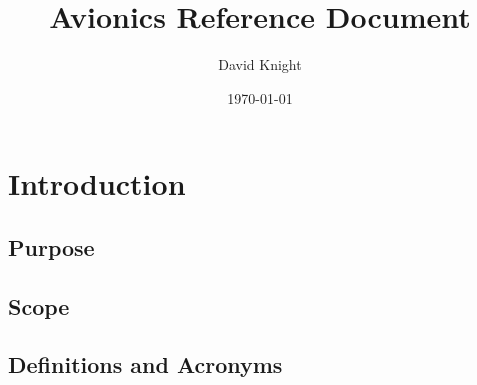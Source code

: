 \documentclass{article}
\title{Avionics Reference Document}
\author{David Knight}
\date{\today}
\begin{document}
\maketitle
{}
\newpage
\tableofcontents
{}
\newpage
\listoftables
\newpage
\listoffigures
\newpage

\section{Introduction}
\subsection{Purpose}
\subsection{Scope}
\subsection{Definitions and Acronyms}
\newpage

\pagebreak




\end{document}
